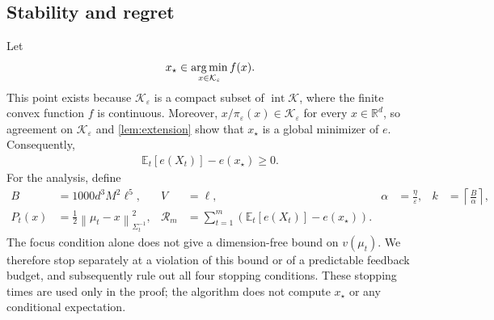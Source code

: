 \documentclass[11pt]{article}
\newcommand{\R}{\mathbb R}
\newcommand{\E}{\mathbb E}
\newcommand{\K}{\mathcal K}
\newcommand{\argmin}{\operatornamewithlimits{arg\,min}}
\newcommand{\1}{\mathbf 1}
\newcommand{\eps}{\varepsilon}
\newcommand{\normm}[2]{\left\lVert #1\right\rVert_{#2}}
\begin{document}
\subsection{Stability and regret}
\label{sec:stability}

Let
\begin{align}
    x_\star\in\argmin_{x\in\K_\eps}f(x).
    \label{eq:xstar}
\end{align}
This point exists because $\K_\eps$ is a compact subset of
$\operatorname{int}\K$, where the finite convex function $f$ is continuous.
Moreover, $x/\pi_\eps(x)\in\K_\eps$ for every $x\in\R^d$, so agreement on
$\K_\eps$ and \cref{lem:extension} show that $x_\star$ is a global
minimizer of $e$. Consequently,
\begin{align}
    \E_t[e(X_t)]-e(x_\star)\geq0.
    \label{eq:stationarity-sign}
\end{align}
For the analysis, define
\begin{align}
    B      & =1000d^3M^2\ell^5,
           & V                                         & =\ell,
           & \alpha                                    & =\frac{\eta}{\eps},
           & k                                         & =\left\lceil\frac B\alpha\right\rceil,
    \label{eq:analysis-budgets}
    \\
    P_t(x) & =\frac12\normm{\mu_t-x}{\Sigma_t^{-1}}^2,
           & \mathcal R_m                              & =\sum_{t=1}^m
    \left(\E_t[e(X_t)]-e(x_\star)\right).
    \label{eq:analysis-potentials}
\end{align}
The focus condition alone does not give a dimension-free bound on
$v(\mu_t)$. We therefore stop separately at a violation of this bound or
of a predictable feedback budget, and subsequently rule out all four
stopping conditions. These stopping times are used only in the proof;
the algorithm does not compute $x_\star$ or any conditional expectation.
\end{document}

